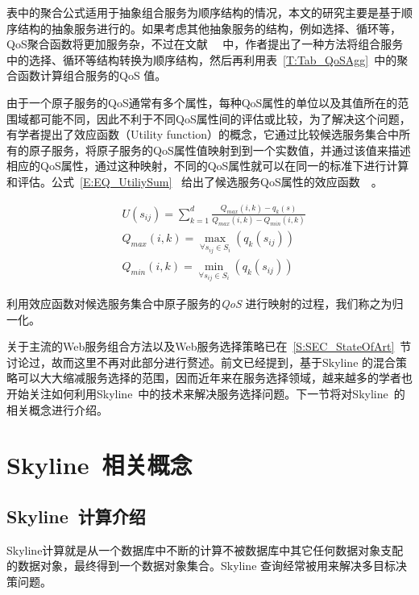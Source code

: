 表中的聚合公式适用于抽象组合服务为顺序结构的情况，本文的研究主要是基于顺序结构的抽象服务进行的。如果考虑其他抽象服务的结构，例如选择、循环等，QoS聚合函数将更加服务杂，不过在文献~\cite{cardoso2004quality}~ 中，作者提出了一种方法将组合服务中的选择、循环等结构转换为顺序结构，然后再利用表~\ref{T:Tab_QoSAgg}~中的聚合函数计算组合服务的QoS 值。

由于一个原子服务的QoS通常有多个属性，每种QoS属性的单位以及其值所在的范围域都可能不同，因此不利于不同QoS属性间的评估或比较，为了解决这个问题，有学者提出了效应函数（Utility function）的概念，它通过比较候选服务集合中所有的原子服务，将原子服务的QoS属性值映射到到一个实数值，并通过该值来描述相应的QoS属性，通过这种映射，不同的QoS属性就可以在同一的标准下进行计算和评估。公式~\ref{E:EQ_UtiliySum}~ 给出了候选服务QoS属性的效应函数~\cite{alrifai2012hybrid}~。

\begin{align}
& U(s_{ij})=\sum^{d}_{k=1}\frac{Q_{max}(i,k)-q_{k}(s)}{Q_{max}(i,k)-Q_{min}(i,k)}  \label{E:EQ_UtiliySum} \\
& Q_{max}(i,k)=\mathop{max}_{\forall s_{ij} \in S_{i}}(q_{k}(s_{ij}))  \label{E:EQ_UtiliyMax} \\
& Q_{min}(i,k)=\mathop{min}_{\forall s_{ij} \in S_{i}}(q_{k}(s_{ij}))  \label{E:EQ_UtilityMin}
\end{align}


\begin{definition}[归一化]
利用效应函数对候选服务集合中原子服务的\emph{QoS} 进行映射的过程，我们称之为归一化。
\end{definition}

关于主流的Web服务组合方法以及Web服务选择策略已在~\ref{S:SEC_StateOfArt}~节讨论过，故而这里不再对此部分进行赘述。前文已经提到，基于Skyline 的混合策略可以大大缩减服务选择的范围，因而近年来在服务选择领域，越来越多的学者也开始关注如何利用Skyline~中的技术来解决服务选择问题。下一节将对Skyline~的相关概念进行介绍。

\section{Skyline~相关概念}

\subsection{Skyline~计算介绍}

Skyline计算就是从一个数据库中不断的计算不被数据库中其它任何数据对象支配的数据对象，最终得到一个数据对象集合。Skyline 查询经常被用来解决多目标决策问题。

